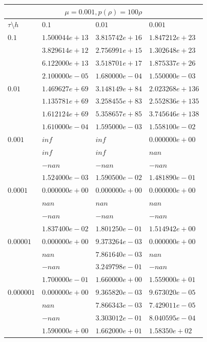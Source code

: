 \documentclass[12pt,a4paper]{article}
\begin{document}
\begin{tabular}{ |l|l|l|l| }
    \hline
    \multicolumn{4}{|c|}{$\mu = 0.001, p(\rho)  = 100\rho$}\\
    \hline
    $\tau\setminus h$ & $0.1$ & $0.01$ & $0.001$ \\
    \hline
    $0.1$ & $1.500044e+13$ & $3.815742e+16$ & $1.847212e+23$ \\
    & $3.829614e+12$ & $2.756991e+15$ & $1.302648e+23$ \\
    & $6.122000e+13$ & $3.518701e+17$ & $1.875337e+26$ \\
    & $2.100000e-05$ & $1.680000e-04$ & $1.550000e-03$ \\
    \hline
    $0.01$ & $1.469627e+69$ & $3.148149e+84$ & $2.023268e+136$ \\
    & $1.135781e+69$ & $3.258455e+83$ & $2.552836e+135$ \\
    & $1.612124e+69$ & $5.358657e+85$ & $3.745646e+138$ \\
    & $1.610000e-04$ & $1.595000e-03$ & $1.558100e-02$ \\
    \hline
    $0.001$ & $inf$ & $inf$ & $0.000000e+00$ \\
    & $inf$ & $inf$ & $nan$ \\
    & $-nan$ & $-nan$ & $-nan$ \\
    & $1.524000e-03$ & $1.590500e-02$ & $1.481890e-01$ \\
    \hline
    $0.0001$ & $0.000000e+00$ & $0.000000e+00$ & $0.000000e+00$ \\
    & $nan$ & $nan$ & $nan$ \\
    & $-nan$ & $-nan$ & $-nan$ \\
    & $1.837400e-02$ & $1.801250e-01$ & $1.514942e+00$ \\
    \hline
    $0.00001$ & $0.000000e+00$ & $9.373264e-03$ & $0.000000e+00$ \\
    & $nan$ & $7.861640e-03$ & $nan$ \\
    & $-nan$ & $3.249798e-01$ & $-nan$ \\
    & $1.700000e-01$ & $1.660000e+00$ & $1.559000e+01$ \\
    \hline
    $0.000001$ & $0.000000e+00$ & $9.365820e-03$ & $9.673020e-05$ \\
    & $nan$ & $7.866343e-03$ & $7.429011e-05$ \\
    & $-nan$ & $3.303012e-01$ & $8.040595e-04$ \\
    & $1.590000e+00$ & $1.662000e+01$ & $1.58350e+02$ \\
    \hline
\end{tabular}
\end{document}

